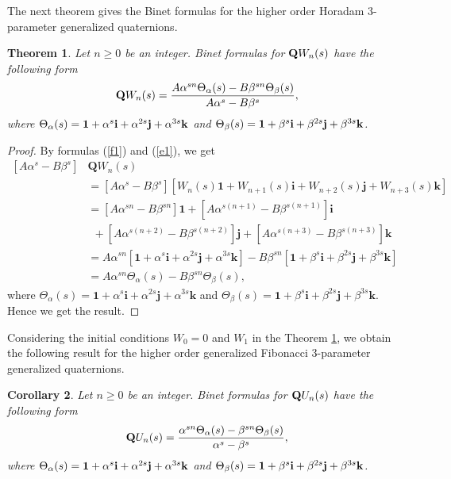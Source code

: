 \documentclass{kms-c}
\theoremstyle{plain}
\newtheorem{theorem}{Theorem}[section]
\newtheorem{corollary}[theorem]{Corollary}
\theoremstyle{definition}
\theoremstyle{remark}
\begin{document}
The next theorem gives the Binet formulas for the higher order Horadam 3-parameter generalized quaternions.
\begin{theorem}\label{t3}
Let $n\geq 0$ be an integer. Binet formulas for $\textnormal{\textbf{Q}}W_{n}(s)$ have the following form
\[
\textnormal{\textbf{Q}}W_{n}(s)=\frac{A\alpha^{sn}\Theta_{\alpha}(s)-B\beta^{sn}\Theta_{\beta}(s)}{A\alpha^{s}-B\beta^{s}},
\]
where $\Theta_{\alpha}(s)=\textnormal{\textbf{1}}+\alpha^{s}\textnormal{\textbf{i}}+\alpha^{2s}\textnormal{\textbf{j}}+\alpha^{3s}\textnormal{\textbf{k}}$ and $\Theta_{\beta}(s)=\textnormal{\textbf{1}}+\beta^{s}\textnormal{\textbf{i}}+\beta^{2s}\textnormal{\textbf{j}}+\beta^{3s}\textnormal{\textbf{k}}$.
\end{theorem}
\begin{proof}
By formulas (\ref{f1}) and (\ref{e1}), we get
\begin{align*}
\left[A\alpha^{s}-B\beta^{s}\right]&\textbf{Q}W_{n}(s)\\
&=\left[A\alpha^{s}-B\beta^{s}\right]\left[W_{n}(s)\textbf{1}+W_{n+1}(s)\textbf{i}+W_{n+2}(s)\textbf{j}+W_{n+3}(s)\textbf{k}\right]\\
&=\left[A\alpha^{sn}-B\beta^{sn}\right]\textbf{1}+\left[A\alpha^{s(n+1)}-B\beta^{s(n+1)}\right]\textbf{i}\\
&\ \ + \left[A\alpha^{s(n+2)}-B\beta^{s(n+2)}\right]\textbf{j}+\left[A\alpha^{s(n+3)}-B\beta^{s(n+3)}\right]\textbf{k}\\
&=A\alpha^{sn}\left[\textbf{1}+\alpha^{s}\textbf{i}+\alpha^{2s}\textbf{j}+\alpha^{3s}\textbf{k}\right]-B\beta^{sn}\left[\textbf{1}+\beta^{s}\textbf{i}+\beta^{2s}\textbf{j}+\beta^{3s}\textbf{k}\right]\\
&=A\alpha^{sn}\Theta_{\alpha}(s)-B\beta^{sn}\Theta_{\beta}(s),
\end{align*}
where $\Theta_{\alpha}(s)=\textbf{1}+\alpha^{s}\textbf{i}+\alpha^{2s}\textbf{j}+\alpha^{3s}\textbf{k}$ and $\Theta_{\beta}(s)=\textbf{1}+\beta^{s}\textbf{i}+\beta^{2s}\textbf{j}+\beta^{3s}\textbf{k}$. Hence we get the result.
\end{proof}

Considering the initial conditions $W_{0}=0$ and $W_{1}$ in the Theorem \ref{t3}, we obtain the following result for the higher order generalized Fibonacci 3-parameter generalized quaternions.
\begin{corollary}
Let $n\geq 0$ be an integer. Binet formulas for $\textnormal{\textbf{Q}}U_{n}(s)$ have the following form
\[
\textnormal{\textbf{Q}}U_{n}(s)=\frac{\alpha^{sn}\Theta_{\alpha}(s)-\beta^{sn}\Theta_{\beta}(s)}{\alpha^{s}-\beta^{s}},
\]
where $\Theta_{\alpha}(s)=\textnormal{\textbf{1}}+\alpha^{s}\textnormal{\textbf{i}}+\alpha^{2s}\textnormal{\textbf{j}}+\alpha^{3s}\textnormal{\textbf{k}}$ and $\Theta_{\beta}(s)=\textnormal{\textbf{1}}+\beta^{s}\textnormal{\textbf{i}}+\beta^{2s}\textnormal{\textbf{j}}+\beta^{3s}\textnormal{\textbf{k}}$.
\end{corollary}
\end{document}
